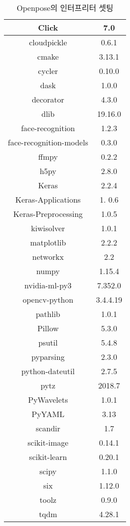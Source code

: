 \documentclass{oblivoir}
\begin{document}
\begin{table}[h!]
    \centering
        \begin{tabular}{|c|c|}
            \hline\hline
            Click & 7.0 \\ \hline
            cloudpickle & 0.6.1 \\ \hline
            cmake & 3.13.1 \\ \hline
            cycler& 0.10.0 \\ \hline
            dask & 1.0.0 \\ \hline
            decorator & 4.3.0 \\ \hline
            dlib & 19.16.0 \\ \hline
            face-recognition &  1.2.3 \\ \hline
            face-recognition-models & 0.3.0 \\ \hline
            ffmpy & 0.2.2 \\ \hline
            h5py & 2.8.0 \\ \hline
            Keras & 2.2.4 \\ \hline
            Keras-Applications & 1. 0.6 \\ \hline
            Keras-Preprocessing & 1.0.5 \\ \hline
            kiwisolver & 1.0.1 \\ \hline
            matplotlib & 2.2.2 \\ \hline
            networkx &  2.2 \\ \hline
            numpy & 1.15.4 \\ \hline
            nvidia-ml-py3 & 7.352.0 \\ \hline
            opencv-python & 3.4.4.19 \\ \hline
            pathlib & 1.0.1 \\ \hline
            Pillow & 5.3.0 \\ \hline
            psutil & 5.4.8 \\ \hline
            pyparsing & 2.3.0 \\ \hline
            python-dateutil & 2.7.5 \\ \hline
            pytz & 2018.7 \\ \hline
            PyWavelets &  1.0.1 \\ \hline
            PyYAML &  3.13 \\ \hline
            scandir & 1.7 \\ \hline
            scikit-image & 0.14.1 \\ \hline
            scikit-learn & 0.20.1 \\ \hline
            scipy & 1.1.0 \\ \hline
            six & 1.12.0 \\ \hline
            toolz  & 0.9.0 \\ \hline
            tqdm & 4.28.1 \\ \hline
            \hline\hline
        \end{tabular}
	\caption{Openpose의 인터프리터 셋팅 }
\end{table}
\end{document}
